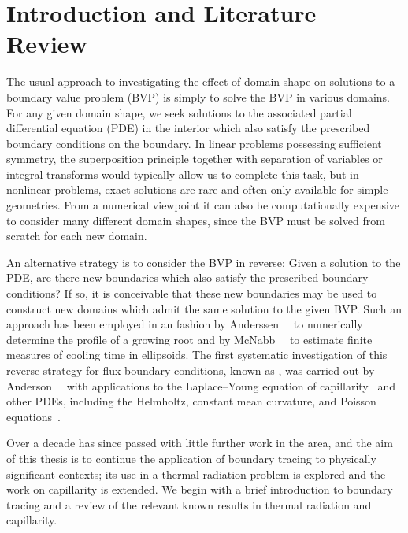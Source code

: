 \chapter{Introduction and Literature Review}
\label{ch:introduction}

The usual approach
to investigating the effect of domain shape
on solutions to a boundary value problem (BVP)
is simply to solve the BVP in various domains.
For any given domain shape, we seek solutions
to the associated partial differential equation (PDE) in the interior
which also satisfy the prescribed boundary conditions on the boundary.
In linear problems possessing sufficient symmetry,
the superposition principle
together with separation of variables or integral transforms
would typically allow us to complete this task,
but in nonlinear problems,
exact solutions are rare and often only available for simple geometries.
From a numerical viewpoint
it can also be computationally expensive
to consider many different domain shapes,
since the BVP must be solved from scratch for each new domain.

An alternative strategy is to
consider the BVP in reverse:
Given a solution to the PDE\@, are there new boundaries
which also satisfy the prescribed boundary conditions?
If so, it is conceivable that these new boundaries may be used
to construct new domains
which admit the same solution to the given BVP\@.
Such an approach has been employed in an \adhoc{} fashion
by Anderssen~\etal~\cite{anderssen-1969-ion-uptake-growing-roots}
to numerically determine the profile of a growing root
and by McNabb~\etal~\cite{mcnabb-1991-theoretical-derivation-freezing-times}
to estimate finite measures of cooling time in ellipsoids.
The first systematic investigation of this
reverse strategy for flux boundary conditions,
known as ,
was carried out by
Anderson~\etal~\cite{anderson-2007-boundary-tracing-i-theory}
with applications to the Laplace--Young equation
of capillarity~\cite{anderson-2006-exact-solutions-laplace-young}
and other PDEs, including the Helmholtz,
constant mean curvature, and
Poisson equations~\cite{anderson-2007-boundary-tracing-ii-applications}.

Over a decade has since passed
with little further work in the area,
and the aim of this thesis is to
continue the application of boundary tracing
to physically significant contexts;
its use in a thermal radiation problem is explored
and the work on capillarity is extended.
We begin with a brief introduction to boundary tracing
and a review of the relevant known results
in thermal radiation and capillarity.

